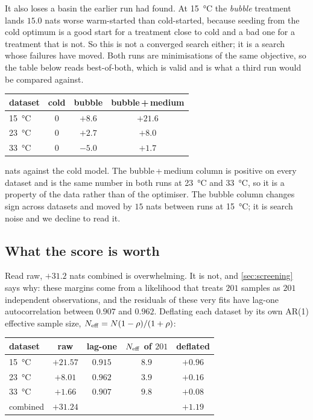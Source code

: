\documentclass[10pt]{article}
\begin{document}
It also loses a basin the earlier run had found. At \SI{15}{\celsius} the \emph{bubble}
treatment lands $15.0$ nats worse warm-started than cold-started, because seeding from the
cold optimum is a good start for a treatment close to cold and a bad one for a treatment that
is not. So this is not a converged search either; it is a search whose failures have moved.
Both runs are minimisations of the same objective, so the table below reads best-of-both,
which is valid and is what a third run would be compared against.

\begin{center}
\begin{tabular}{lccc}
\toprule
dataset & cold & bubble & bubble\,+\,medium \\
\midrule
\SI{15}{\celsius} & $0$ & $+8.6$ & $\mathbf{+21.6}$ \\
\SI{23}{\celsius} & $0$ & $+2.7$ & $\mathbf{+8.0}$ \\
\SI{33}{\celsius} & $0$ & $-5.0$ & $\mathbf{+1.7}$ \\
\bottomrule
\end{tabular}
\end{center}

\noindent nats against the cold model. The bubble\,+\,medium column is positive on every
dataset and is the same number in both runs at \SI{23}{\celsius} and \SI{33}{\celsius}, so it
is a property of the data rather than of the optimiser. The bubble column changes sign across
datasets and moved by $15$ nats between runs at \SI{15}{\celsius}; it is search noise and we
decline to read it.

\subsection*{What the score is worth}

Read raw, $+31.2$ nats combined is overwhelming. It is not, and \cref{sec:screening} says why:
these margins come from a likelihood that treats $201$ samples as $201$ independent
observations, and the residuals of these very fits have lag-one autocorrelation between
$0.907$ and $0.962$. Deflating each dataset by its own AR(1) effective sample size,
$N_{\rm eff} = N(1-\rho)/(1+\rho)$:

\begin{center}
\begin{tabular}{lcccc}
\toprule
dataset & raw & lag-one & $N_{\rm eff}$ of $201$ & deflated \\
\midrule
\SI{15}{\celsius} & $+21.57$ & $0.915$ & $8.9$ & $+0.96$ \\
\SI{23}{\celsius} & $+8.01$ & $0.962$ & $3.9$ & $+0.16$ \\
\SI{33}{\celsius} & $+1.66$ & $0.907$ & $9.8$ & $+0.08$ \\
\midrule
combined & $+31.24$ & & & $\mathbf{+1.19}$ \\
\bottomrule
\end{tabular}
\end{center}
\end{document}
